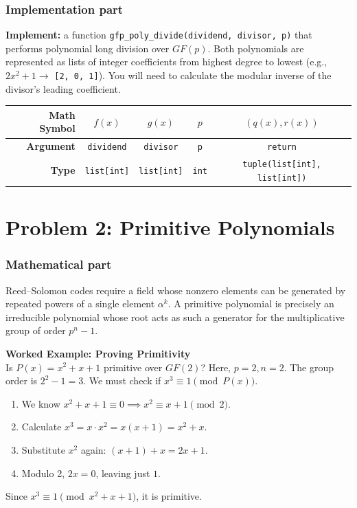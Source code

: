 \documentclass[11pt]{article}
\begin{document}
\subsubsection*{Implementation part}
\textbf{Implement:} a function \lstinline|gfp_poly_divide(dividend, divisor, p)| that performs polynomial long division over $GF(p)$. Both polynomials are represented as lists of integer coefficients from highest degree to lowest (e.g., $2x^2 + 1 \rightarrow$ \lstinline|[2, 0, 1]|). You will need to calculate the modular inverse of the divisor's leading coefficient.

\begin{center}
\renewcommand{\arraystretch}{2.0}
\begin{tabular}{r | c | c | c | c}
\toprule
\textbf{Math Symbol} & $f(x)$ & $g(x)$ & $p$ & $(q(x), r(x))$ \\ \midrule
\textbf{Argument} & \lstinline|dividend| & \lstinline|divisor| & \lstinline|p| & \lstinline|return| \\ \midrule
\textbf{Type} & \lstinline|list[int]| & \lstinline|list[int]| & \lstinline|int| & \lstinline|tuple(list[int], list[int])| \\
\bottomrule
\end{tabular}
\end{center}

\section*{Problem 2: Primitive Polynomials}

\subsubsection*{Mathematical part}
Reed--Solomon codes require a field whose nonzero elements can be generated by repeated powers of a single element $\alpha^k$. A primitive polynomial is precisely an irreducible polynomial whose root acts as such a generator for the multiplicative group of order $p^n - 1$.

\textbf{Worked Example: Proving Primitivity} \\
Is $P(x) = x^2 + x + 1$ primitive over $GF(2)$? Here, $p=2, n=2$. The group order is $2^2 - 1 = 3$. We must check if $x^3 \equiv 1 \pmod{P(x)}$.
\begin{enumerate}
    \item We know $x^2 + x + 1 \equiv 0 \implies x^2 \equiv x + 1 \pmod 2$.
    \item Calculate $x^3 = x \cdot x^2 = x(x + 1) = x^2 + x$.
    \item Substitute $x^2$ again: $(x + 1) + x = 2x + 1$.
    \item Modulo 2, $2x = 0$, leaving just $1$.
\end{enumerate}
Since $x^3 \equiv 1 \pmod{x^2+x+1}$, it is primitive.
\end{document}
